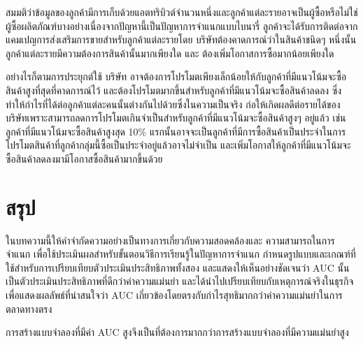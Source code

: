 \documentclass[twoside, twocolumn, 12pt]{article}
\begin{document}
สมมติว่าข้อมูลของลูกค้ามีการเก็บด้วยแอตทริบิวต์จำนวนหนึ่งและลูกค้าแต่ละรายอาจเป็นผู้ซื้อหรือไม่ใช่ผู้ซื้อผลิตภัณฑ์บางอย่างเนื่องจากปัญหานี้เป็นปัญหาการจำแนกแบบไบนารี่ ลูกค้าจะได้รับการติดต่อจากแคมเปญการส่งเสริมการขายสำหรับลูกค้าแต่ละรายโดย บริษัทต้องคาดการณ์ว่าในสินค้าชนิดๆ หนึ่งนั้นลูกค้าแต่ละรายมีความต้องการสินค้านั้นมากเพียงใด และ ต้องเพิ่มโอกาสการซื้อมากน้อยเพียงใด

อย่างไรก็ตามการประยุกต์ใช้ บริษัท อาจต้องการโปรโมตเพียงเล็กน้อยให้กับลูกค้าที่มีแนวโน้มจะซื้อสินค้าสูงที่สุดที่คาดการณ์ไว้ และต้องโปรโมตมากขึ้นสำหรับลูกค้าที่มีแนวโน้มจะซื้อสินค้าลดลง ซึ่งทำให้กำไรที่ได้ต่อลูกค้าแต่ละคนนั้นต่างกันไปด้วยซึ่งในความเป็นจริง ก่อให้เกิดผลดีต่อรายได้ของบริษัทเพราะสามารถลดการโปรโมตเกินจำเป็นสำหรับลูกค้าที่มีแนวโน้มจะซื้อสินค้าสูงๆ อยู่แล้ว เช่น ลูกค้าที่มีแนวโน้มจะซื้อสินค้าสูงสุด 10\% แรกนั้นอาจจะเป็นลูกค้าที่มีการซื้อสินค้าเป็นประจำในการโปรโมตสินค้าที่ลูกค้ากลุ่มนี้ซื้อเป็นประจำอยู่แล้วอาจไม่จำเป็น และเพิ่มโอกาสให้ลูกค้าที่มีแนวโน้มจะซื้อสินค้าลดลงมามีโอกาสซื้อสินค้ามากขึ้นด้วย 
\section{สรุป}
\quad ในบทความนี้ให้คำจำกัดความอย่างเป็นทางการเกี่ยวกับความสอดคล้องและ ความสามารถในการจำแนก เพื่อใช้ประเมินผลสำหรับขั้นตอนวิธีการเรียนรู้ในปัญหาการจำแนก กำหนดรูปแบบและเกณฑ์ที่ใช้สำหรับการเปรียบเทียบตัวประเมินประสิทธิภาพทั้งสอง และแสดงให้เห็นอย่างชัดเจนว่า AUC นั้นเป็นตัวประเมินประสิทธิภาพที่ดีกว่าค่าความแม่นยำ และได้นำไปเปรียบเทียบกับเหตุการณ์จริงในธุรกิจเพื่อแสดงผลลัพธ์ที่น่าสนใจว่า AUC เกี่ยวข้องโดยตรงกับกำไรสุทธิมากกว่าค่าความแม่นยำในการตลาดทางตรง

การสร้างแบบจำลองที่มีค่า AUC สูงจึงเป็นที่ต้องการมากกว่าการสร้างแบบจำลองที่มีความแม่นยำสูง
\renewcommand\refname{ข้อมูลอ้างอิง}
\end{document}
